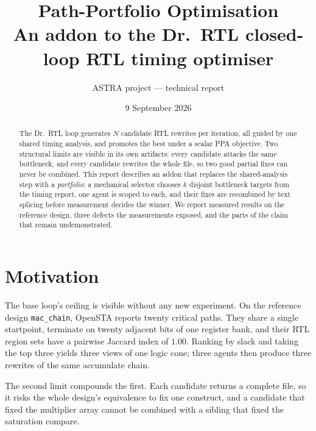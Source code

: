 \documentclass[11pt,a4paper]{article}
\title{\textbf{Path-Portfolio Optimisation}\\[2pt]
       \large An addon to the Dr.\ RTL closed-loop RTL timing optimiser}
\author{ASTRA project --- technical report}
\date{9 September 2026}
\begin{document}
\maketitle

\begin{abstract}
\noindent
The Dr.\ RTL loop generates $N$ candidate RTL rewrites per iteration, all
guided by one shared timing analysis, and promotes the best under a scalar
PPA objective. Two structural limits are visible in its own artifacts: every
candidate attacks the same bottleneck, and every candidate rewrites the whole
file, so two good partial fixes can never be combined. This report describes
an addon that replaces the shared-analysis step with a \emph{portfolio}: a
mechanical selector chooses $k$ disjoint bottleneck targets from the timing
report, one agent is scoped to each, and their fixes are recombined by text
splicing before measurement decides the winner. We report measured results on
the reference design, three defects the measurements exposed, and the parts of
the claim that remain undemonstrated.
\end{abstract}

\section{Motivation}

The base loop's ceiling is visible without any new experiment. On the
reference design \texttt{mac\_chain}, OpenSTA reports twenty critical paths.
They share a single startpoint, terminate on twenty adjacent bits of one
register bank, and their RTL region sets have a pairwise Jaccard index of
$1.00$. Ranking by slack and taking the top three yields three views of one
logic cone; three agents then produce three rewrites of the same accumulate
chain.

The second limit compounds the first. Each candidate returns a complete file,
so it risks the whole design's equivalence to fix one construct, and a
candidate that fixed the multiplier array cannot be combined with a sibling
that fixed the saturation compare.
\end{document}
